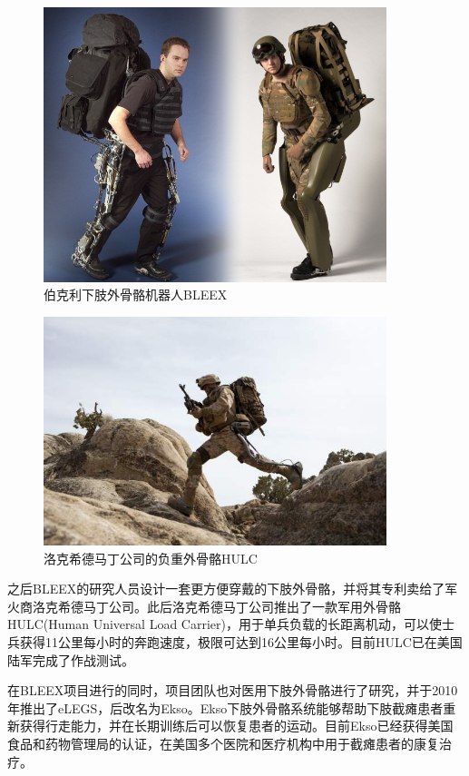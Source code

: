 \begin{figure}[htb]
    \includegraphics[width=10cm]{fig/f5_BLEEX.jpg}
    \caption{伯克利下肢外骨骼机器人BLEEX\cite{p5,p7}}
    \label{fig:mark}
\end{figure}

\begin{figure}[!htb]
    \includegraphics[width=10cm]{fig/f5_HULC.jpg}
    \caption{洛克希德马丁公司的负重外骨骼HULC\cite{p10}}
    \label{fig:mark}
\end{figure}

之后BLEEX的研究人员设计一套更方便穿戴的下肢外骨骼\cite{p10}，并将其专利卖给了军火商洛克希德马丁公司。此后洛克希德马丁公司推出了一款军用外骨骼HULC(Human Universal Load Carrier)，用于单兵负载的长距离机动，可以使士兵获得11公里每小时的奔跑速度，极限可达到16公里每小时。目前HULC已在美国陆军完成了作战测试。

在BLEEX项目进行的同时，项目团队也对医用下肢外骨骼进行了研究，并于2010年推出了eLEGS\cite{p9}，后改名为Ekso。Ekso下肢外骨骼系统能够帮助下肢截瘫患者重新获得行走能力，并在长期训练后可以恢复患者的运动。目前Ekso已经获得美国食品和药物管理局的认证，在美国多个医院和医疗机构中用于截瘫患者的康复治疗。

